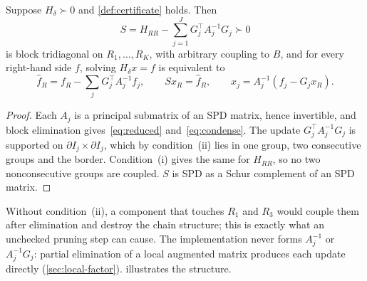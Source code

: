 \begin{theorem}\label{thm:chain}
Suppose $H_\delta\succ0$ and \cref{def:certificate} holds. Then
\begin{equation}\label{eq:reduced}
S=H_{RR}-\sum_{j=1}^{J}G_j^\top A_j^{-1}G_j\succ0
\end{equation}
is block tridiagonal on $R_1,\ldots,R_K$, with arbitrary coupling to $B$, and for
every right-hand side $f$, solving $H_\delta x=f$ is equivalent to
\begin{equation}\label{eq:condense}
\widehat f_R=f_R-\sum_jG_j^\top A_j^{-1}f_j,\qquad
Sx_R=\widehat f_R,\qquad
x_j=A_j^{-1}(f_j-G_jx_R).
\end{equation}
\end{theorem}

\begin{proof}
Each $A_j$ is a principal submatrix of an SPD matrix, hence invertible, and block
elimination gives~\eqref{eq:reduced} and~\eqref{eq:condense}. The update
$G_j^\top A_j^{-1}G_j$ is supported on $\partial I_j\times\partial I_j$, which by
condition~(ii) lies in one group, two consecutive groups and the border.
Condition~(i) gives the same for $H_{RR}$, so no two nonconsecutive groups are
coupled. $S$ is SPD as a Schur complement of an SPD matrix.
\end{proof}

Without condition~(ii), a component that touches $R_1$ and $R_3$ would couple them
after elimination and destroy the chain structure; this is exactly what an
unchecked pruning step can cause. The implementation never forms $A_j^{-1}$ or
$A_j^{-1}G_j$: partial elimination of a local augmented matrix produces each
update directly (\cref{sec:local-factor}).  illustrates the
structure.

